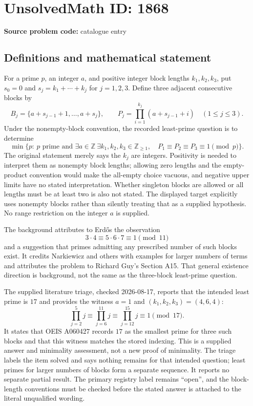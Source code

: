 \documentclass[11pt]{article}
\newcommand{\Z}{\mathbb{Z}}
\begin{document}
\section*{UnsolvedMath ID: 1868}
\textbf{Source problem code:} catalogue entry
\subsection{Definitions and mathematical statement}
For a prime $p$, an integer $a$, and positive integer block lengths $k_1,k_2,k_3$, put $s_0=0$ and $s_j=k_1+\cdots+k_j$ for $j=1,2,3$. Define three adjacent consecutive blocks by
\[
B_j=\{a+s_{j-1}+1,\ldots,a+s_j\},\qquad
P_j=\prod_{i=1}^{k_j}(a+s_{j-1}+i)\quad(1\leq j\leq3).
\]
Under the nonempty-block convention, the recorded least-prime question is to determine
\[
\min\{p:\ p\text{ prime and }\exists a\in\Z\ \exists k_1,k_2,k_3\in\Z_{\geq1},\quad
P_1\equiv P_2\equiv P_3\equiv1\pmod p\}.
\]
The original statement merely says the $k_j$ are integers. Positivity is needed to interpret them as nonempty block lengths; allowing zero lengths and the empty-product convention would make the all-empty choice vacuous, and negative upper limits have no stated interpretation. Whether singleton blocks are allowed or all lengths must be at least two is also not stated. The displayed target explicitly uses nonempty blocks rather than silently treating that as a supplied hypothesis. No range restriction on the integer $a$ is supplied.

The background attributes to Erdős the observation
\[
3\cdot4\equiv5\cdot6\cdot7\equiv1\pmod{11}
\]
and a suggestion that primes admitting any prescribed number of such blocks exist. It credits Narkiewicz and others with examples for larger numbers of terms and attributes the problem to Richard Guy's Section A15. That general existence direction is background, not the same as the three-block least-prime question.

The supplied literature triage, checked 2026-08-17, reports that the intended least prime is $17$ and provides the witness $a=1$ and $(k_1,k_2,k_3)=(4,6,4)$:
\[
\prod_{j=2}^{5}j\equiv\prod_{j=6}^{11}j\equiv\prod_{j=12}^{15}j\equiv1\pmod{17}.
\]
It states that OEIS A060427 records $17$ as the smallest prime for three such blocks and that this witness matches the stored indexing. This is a supplied answer and minimality assessment, not a new proof of minimality. The triage labels the item solved and says nothing remains for that intended question; least primes for larger numbers of blocks form a separate sequence. It reports no separate partial result. The primary registry label remains ``open'', and the block-length conventions must be checked before the stated answer is attached to the literal unqualified wording.
\end{document}
